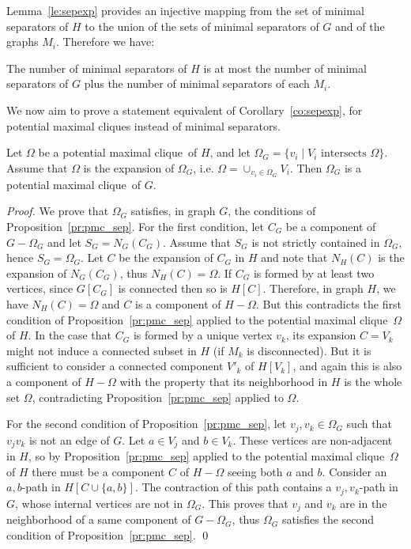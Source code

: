 \documentclass{llncs}
\newcommand{\pmc}{potential maximal clique}
\begin{document}
Lemma~\ref{le:sepexp} provides an injective mapping from the set of minimal separators of $H$ to the union of the sets of minimal separators of $G$ and of the graphs $M_i$. Therefore we have:
\begin{corollary}\label{co:sepexp}
The number of minimal separators of $H$ is at most the number of minimal separators of $G$ plus the number of minimal separators of each $M_i$. 
\end{corollary}


We now aim to prove a statement equivalent of Corollary~\ref{co:sepexp}, for potential maximal cliques instead of minimal separators. 

\begin{lemma}\label{le:pmcexp}
Let $\Omega$ be a \pmc\ of $H$, and let $\Omega_G = \{v_i \mid V_i \text{~intersects~} \Omega\}$. Assume that $\Omega$ is the expansion of $\Omega_G$, i.e. $\Omega  = \cup_{v_i \in \Omega_G} V_i$. Then $\Omega_G$ is a \pmc\ of $G$.
\end{lemma} 
\begin{proof}
We prove that $\Omega_G$ satisfies, in graph $G$, the conditions of Proposition~\ref{pr:pmc_sep}. For the first condition, let $C_G$ be a component of $G - \Omega_G$ and let $S_G = N_G(C_G)$. Assume that $S_G$ is not strictly contained in $\Omega_G$, hence $S_G = \Omega_G$. Let $C$ be the expansion of $C_G$ in $H$ and note that $N_H(C)$ is the expansion of $N_G(C_G)$, thus $N_H(C) = \Omega$. If $C_G$ is formed by at least two vertices, since $G[C_G]$ is connected then so is $H[C]$.  Therefore, in graph $H$, we have $N_H(C) = \Omega$ and $C$ is a component of $H - \Omega$. But this contradicts the first condition of Proposition~\ref{pr:pmc_sep} applied to the \pmc\ $\Omega$ of $H$. In the case that $C_G$ is formed by a unique vertex $v_k$, its expansion $C = V_k$ might not induce a connected subset in $H$ (if $M_k$ is disconnected). But it is sufficient to consider a connected component $V'_k$ of $H[V_k]$, and again this is also a component of $H - \Omega$ with the property that its neighborhood in $H$ is the whole set $\Omega$, contradicting Proposition~\ref{pr:pmc_sep} applied to $\Omega$.

For the second condition of Proposition~\ref{pr:pmc_sep}, let $v_j, v_k \in \Omega_G$ such that $v_jv_k$ is not an edge of $G$. Let $a \in V_j$ and $b \in V_k$. These vertices are non-adjacent in $H$, so by Proposition~\ref{pr:pmc_sep} applied to the \pmc\ $\Omega$ of $H$ there must be a component $C$ of $H - \Omega$ seeing both $a$ and $b$. Consider an $a,b$-path in $H[C \cup \{a,b\}]$. The contraction of this path contains a $v_j,v_k$-path in $G$, whose internal vertices are not in $\Omega_G$. This proves that $v_j$ and $v_k$ are in the neighborhood of a same component of $G - \Omega_G$, thus $\Omega_G$ satisfies the second condition of Proposition~\ref{pr:pmc_sep}.
\qed
\end{proof}
\end{document}
